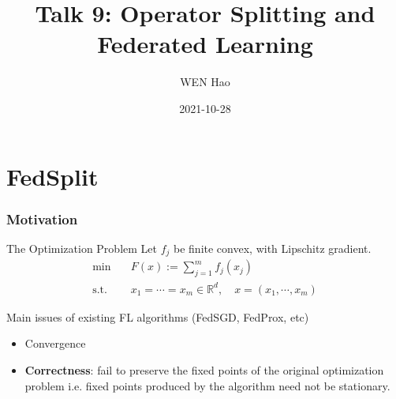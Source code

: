 


\title[]{Talk 9: Operator Splitting and Federated Learning}
\date{2021-10-28}
\author[]{WEN Hao}




\setlength{\belowdisplayskip}{5pt} \setlength{\belowdisplayshortskip}{5pt}
\setlength{\abovedisplayskip}{5pt} \setlength{\abovedisplayshortskip}{5pt}


\begin{frame}
\titlepage %
\end{frame}


\section{FedSplit}


\begin{frame}
\frametitle{Motivation}

\begin{block}{The Optimization Problem}
Let $f_j$ be finite convex, with Lipschitz gradient.
\vspace{-0.6em}
\begin{align*}
    \text{min} & \quad F(x) := \sum_{j=1}^m f_j(x_j) \\
    \text{s.t.} & \quad x_1 = \cdots = x_m \in \mathbb{R}^d, \quad x = (x_1, \cdots, x_m)
\end{align*}
\end{block}

Main issues of existing FL algorithms (FedSGD, FedProx, etc)

\begin{itemize}
    \item Convergence
    \item {\bf Correctness}: fail to preserve the fixed points of the original optimization problem i.e. fixed points produced by the algorithm need not be stationary.
\end{itemize}


\end{frame}


